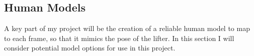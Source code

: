 \subsection{Human Models}

A key part of my project will be the creation of a reliable human model to map to each frame, so that it mimics the pose of the lifter. In this section I will consider potential model options for use in this project.




